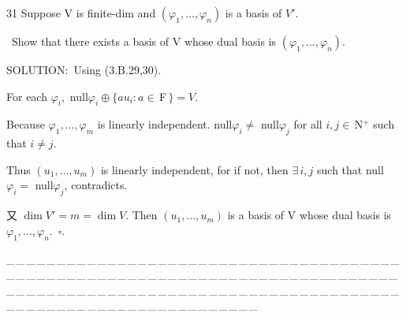 \documentclass[a4paper, 11pt, UTF8]{article}
\def\Fbf{$\,{\timesbf F}\,$}
\def\Nbp{$\,{\timesbf N}$^+}
\begin{document}
\begin{large}
{\timesbf\Large 31} {\timessl\Large 
Suppose V is finite-dim and $(\varphi_1,\dots,\varphi_n)$ is a basis of $V'$.}\par\quad\,
{\timessl\Large Show that
there exists a basis of V whose dual basis is $(\varphi_1,\dots,\varphi_n).$
}\par
{\timesbf S{\small OLUTION:}}\,\,\,Using (3.B.29,30).\par\quad For each $\varphi_i$,\,\,\,null$\varphi_i\oplus\{au_i:a\in\Fbf\}=V.$\par\quad
Because $\varphi_1,\dots,\varphi_m$ is linearly independent. null$\varphi_i\neq$ null$\varphi_j$ for all $i,j\in\Nbp$ such that $i\neq j$.\par\quad
Thus $(u_1,\dots,u_m)$ is linearly independent, for if not, then $\exists\,i,j$ such that null$\varphi_i=$ null$\varphi_j$, contradicts.\par\quad
又 $\dim V'=m=\dim V$. Then $(u_1,\dots,u_m)$ is a basis of V whose dual basis is $\varphi_1,\dots,\varphi_n.\,\,\,\square$.\par
{\tiny \_\,\_\,\_\,\_\,\_\,\_\,\_\,\_\,\_\,\_\,\_\,\_\,\_\,\_\,\_\,\_\,\_\,\_\,\_\,\_\,\_\,\_\,\_\,\_\,\_\,\_\,\_\,\_\,\_\,\_\,\_\,\_\,\_\,\_\,\_\,\_\,\_\,\_\,\_\,\_\,\_\,\_\,\_\,\_\,\_\,\_\,\_\,\_\,\_\,\_\,\_\,\_\,\_\,\_\,\_\,\_\,\_\,\_\,\_\,\_\,\_\,\_\,\_\,\_\,\_\,\_\,\_\,\_\,\_\,\_\,\_\_\,\_\,\_\,\_\,\_\,\_\,\_\,\_\,\_\,\_\,\_\,\_\,\_\,\_\,\_\,\_\,\_\,\_\,\_\,\_\,\_\,\_\,\_\,\_\,\_\,\_\,\_\,\_\,\_\,\_\,\_\,\_\,\_\,\_\,\_\,\_\,\_\,\_\,\_\,\_\,\_\,\_\,\_\,\_\,\_\,\_\,\_\,\_\,\_\,\_\,\_\,\_\,\_\,\_\,\_\,\_\,\_\,\_\,\_\,\_\,\_\,\_\,\_\,\_\,\_\,\_\,\_\,\_\,\_\,\_\,\_}\par


\end{large}
\end{document}
